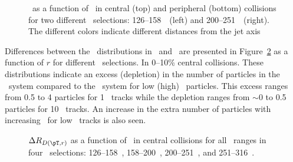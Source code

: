 \begin{figure}
   \caption{\RDptr\ as a function of \pt\ in central (top) and peripheral (bottom) collisions for two different \ptjet\ selections: 126--158~\GeV\ (left) and 200--251~\GeV\ (right). The different colors indicate different distances from the jet axis}
      \label{fig:pttrkdep}
\end{figure}



Differences between the \Dptr\ distributions in \pbpb\ and \pp\ are presented in Figure~\ref{fig:deltadptr} as a function of $r$ for different \pt\ selections. In 0--10\% central collisions. 
These distributions indicate an excess (depletion) in the number of particles in the \pbpb\ system compared to the \pp\ system for low (high) \pt\ particles. This excess ranges from 0.5 to 4 particles for 1 \GeV\ tracks while the depletion ranges from $\sim$0 to 0.5 particles for 10 \GeV\ tracks. An increase in the extra number of particles with increasing \ptjet\ for low \pt\ tracks is also seen.

\begin{figure}
   \caption{$\Delta \RDptr$ as a function of \rvar\ in central collisions for all \pt\ ranges in four \ptjet\ selections: 126--158~\GeV, 158--200~\GeV, 200--251~\GeV, and 251--316~\GeV. }
      \label{fig:deltadptr}
\end{figure}



\FloatBarrier
